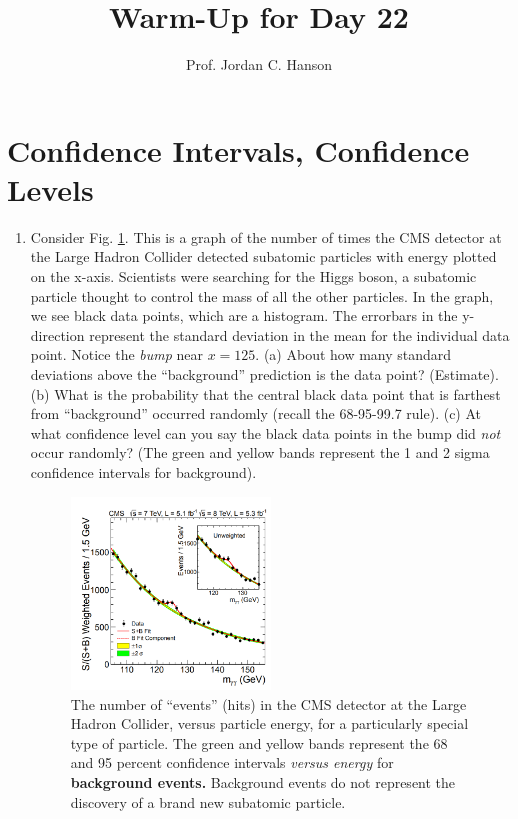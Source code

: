 \documentclass{article}
\begin{document}
\title{Warm-Up for Day 22}
\author{Prof. Jordan C. Hanson}

\maketitle

\section{Confidence Intervals, Confidence Levels}

\begin{enumerate}
\item Consider Fig. \ref{fig:higgs}.  This is a graph of the number of times the CMS detector at the Large Hadron Collider detected subatomic particles with energy plotted on the x-axis.  Scientists were searching for the Higgs boson, a subatomic particle thought to control the mass of all the other particles.  In the graph, we see black data points, which are a histogram.  The errorbars in the y-direction represent the standard deviation in the mean for the individual data point.  Notice the \textit{bump} near $x = 125$.  (a) About how many standard deviations above the ``background'' prediction is the data point? (Estimate). (b) What is the probability that the central black data point that is farthest from ``background'' occurred randomly (recall the 68-95-99.7 rule). (c) At what confidence level can you say the black data points in the bump did \textit{not} occur randomly?  (The green and yellow bands represent the 1 and 2 sigma confidence intervals for background).
\begin{figure}[ht]
\centering
\includegraphics[width=0.5\textwidth]{higgs.png}
\caption{\label{fig:higgs} The number of ``events'' (hits) in the CMS detector at the Large Hadron Collider, versus particle energy, for a particularly special type of particle.  The green and yellow bands represent the 68 and 95 percent confidence intervals \textit{versus energy} for \textbf{background events.}  Background events do not represent the discovery of a brand new subatomic particle.}
\end{figure}
\end{enumerate}
\end{document}
